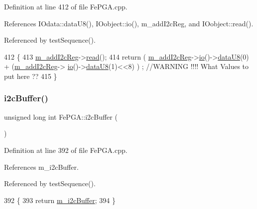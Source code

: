 Definition at line 412 of file Fe\+P\+G\+A.\+cpp.



References I\+Odata\+::data\+U8(), I\+Oobject\+::io(), m\+\_\+add\+I2c\+Reg, and I\+Oobject\+::read().



Referenced by test\+Sequence().


\begin{DoxyCode}
412                                \{
413   \hyperlink{classFePGA_af3ef3467ba803e6d3b970ea8982d6246}{m\_addI2cReg}->\hyperlink{classIOobject_aa07610c11963b1db6710e3c76ceea456}{read}();
414   \textcolor{keywordflow}{return} ( \hyperlink{classFePGA_af3ef3467ba803e6d3b970ea8982d6246}{m\_addI2cReg}->\hyperlink{classIOobject_af04fb94137c3d86849f478ac5afab5d1}{io}()->\hyperlink{classIOdata_a75e9c318dbac3a39402179070943d4bc}{dataU8}(0) + (\hyperlink{classFePGA_af3ef3467ba803e6d3b970ea8982d6246}{m\_addI2cReg}->
      \hyperlink{classIOobject_af04fb94137c3d86849f478ac5afab5d1}{io}()->\hyperlink{classIOdata_a75e9c318dbac3a39402179070943d4bc}{dataU8}(1)<<8) ) ; \textcolor{comment}{//WARNING !!!! What Values to put here ??}
415 \}
\end{DoxyCode}
\mbox{\label{classFePGA_a5577463c8478cb6d54fc3c75b26cd819}} 
\subsubsection{\texorpdfstring{i2c\+Buffer()}{i2cBuffer()}}
{\footnotesize\ttfamily unsigned long int Fe\+P\+G\+A\+::i2c\+Buffer (\begin{DoxyParamCaption}{ }\end{DoxyParamCaption})}



Definition at line 392 of file Fe\+P\+G\+A.\+cpp.



References m\+\_\+i2c\+Buffer.



Referenced by test\+Sequence().


\begin{DoxyCode}
392                                   \{
393   \textcolor{keywordflow}{return} \hyperlink{classFePGA_a173664ffd6a73f454ae31f51e689dd16}{m\_i2cBuffer};
394 \}
\end{DoxyCode}
\mbox{\label{classFePGA_a9c261a09d323c07ec4b9e925d4dfc353}} 
